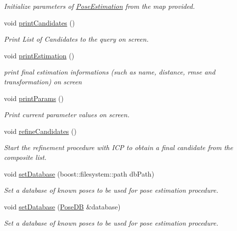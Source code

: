\begin{DoxyCompactItemize}
\begin{DoxyCompactList}\small\item\em Initialize parameters of \hyperlink{classPoseEstimation}{Pose\-Estimation} from the map provided. \end{DoxyCompactList}\item 
void \hyperlink{classPoseEstimation_ac6fee319b5bc9464cc866aaaf99f6a5c}{print\-Candidates} ()
\begin{DoxyCompactList}\small\item\em Print List of Candidates to the query on screen. \end{DoxyCompactList}\item 
void \hyperlink{classPoseEstimation_a2db4ea74cd5715110e5a89422be4cc26}{print\-Estimation} ()
\begin{DoxyCompactList}\small\item\em print final estimation informations (such as name, distance, rmse and transformation) on screen \end{DoxyCompactList}\item 
void \hyperlink{classPoseEstimation_a7f162e3e5383f895d7b6d1cd228ca076}{print\-Params} ()
\begin{DoxyCompactList}\small\item\em Print current parameter values on screen. \end{DoxyCompactList}\item 
void \hyperlink{classPoseEstimation_a808b372ea678164e3a794f695cb2350a}{refine\-Candidates} ()
\begin{DoxyCompactList}\small\item\em Start the refinement procedure with I\-C\-P to obtain a final candidate from the composite list. \end{DoxyCompactList}\item 
void \hyperlink{classPoseEstimation_a0ace84f98f2bab31e64ffaa4eefdf402}{set\-Database} (boost\-::filesystem\-::path db\-Path)
\begin{DoxyCompactList}\small\item\em Set a database of known poses to be used for pose estimation procedure. \end{DoxyCompactList}\item 
void \hyperlink{classPoseEstimation_ad4874b54c2fa79dfdb322d60470754cc}{set\-Database} (\hyperlink{classPoseDB}{Pose\-D\-B} \&database)
\begin{DoxyCompactList}\small\item\em Set a database of known poses to be used for pose estimation procedure. \end{DoxyCompactList}\item 

\end{DoxyCompactItemize}
